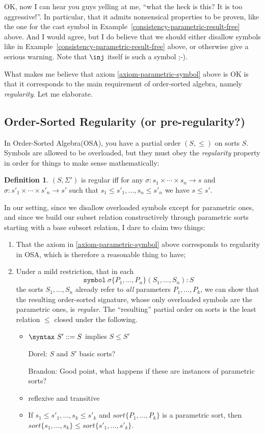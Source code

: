 \documentclass{article}
\newcommand\comment[2]{\par\noindent\color{red}#1: #2\color{black}\par\noindent}
\newcommand\dl{\comment{Dorel}}
\theoremstyle{definition}
\theoremstyle{definition}
\newtheorem{definition}{Definition}[section]
\theoremstyle{definition}
\theoremstyle{theorem}
\theoremstyle{theorem}
\theoremstyle{theorem}
\newcommand{\Sort}[1]{\textit{sort}\{#1\}}
\newcommand{\KWsymbol}{\texttt{symbol}}
\begin{document}
OK, now I can hear you guys yelling at me,
``what the heck is this? It is too aggressive!''.
In particular, that it admits nonsensical properties to be proven,
like the one for the cast symbol in Example~\ref{consistency-parametric-result-free} above.
And I would agree, but I do believe that we
should either disallow symbols like in Example~\ref{consistency-parametric-result-free}
above, or otherwise give a serious warning.
Note that \(\inj\) itself is such a symbol ;-).

What makes me believe that axiom \ref{axiom-parametric-symbol}
above is OK is that it corresponds to the main requirement of
order-sorted algebra, namely \emph{regularity}.
Let me elaborate.

\subsection{Order-Sorted Regularity (or pre-regularity?)}
In Order-Sorted Algebra(OSA), you have a partial order \((S,\le)\) on sorts \(S\).
Symbols are allowed to be overloaded, but they must obey the
\emph{regularity} property in order for things to make sense
mathematically:

\begin{definition}
\((S,\Sigma')\) is regular iff for any
\(\sigma:s_1\times\cdots\times s_n \rightarrow s\) and
\(\sigma:s'_1\times\cdots\times s'_n \rightarrow s'\) such that
\(s_1\le s'_1,\ldots,s_n\le s'_n\) we have \(s \le s'\).
\end{definition}

In our setting, since we disallow overloaded
symbols except for parametric ones, and since we build
our subset relation constructively through
parametric sorts starting with a base subsort relation,
I dare to claim two things:
\begin{enumerate}[label={(\alph*)}]
\item That the axiom in \ref{axiom-parametric-symbol} above corresponds to
regularity in OSA, which is therefore a
reasonable thing to have;
\item Under a mild restriction, that in each
\[\KWsymbol\ \sigma\{P_1,\ldots,P_n\}(S_1,\ldots,S_n):S\]
the sorts \(S_1,\ldots,S_n\) already refer to \emph{all} parameters
\(P_1,\ldots,P_k\), we can show that the resulting order-sorted
signature, whose only overloaded symbols are the parametric ones, is
\emph{regular}.
The ``resulting'' partial order on sorts is the least relation \(\le\)
closed under the following.
\begin{itemize}
\item \(\syntax\ S'::=S\) implies \(S \le S'\)
\dl{$S$ and $S'$ basic sorts?}
\comment{Brandon}{Good point, what happens if these are instances of parametric sorts?}
\item reflexive and transitive
\item If \(s_1\le s'_1,\ldots,s_k\le s'_k\) and
\(\Sort{P_1,\ldots,P_k}\) is a parametric sort,
then \(\Sort{s_1,\ldots,s_k} \le \Sort{s'_1,\ldots,s'_k}\).
\end{itemize}
\end{enumerate}
\end{document}
